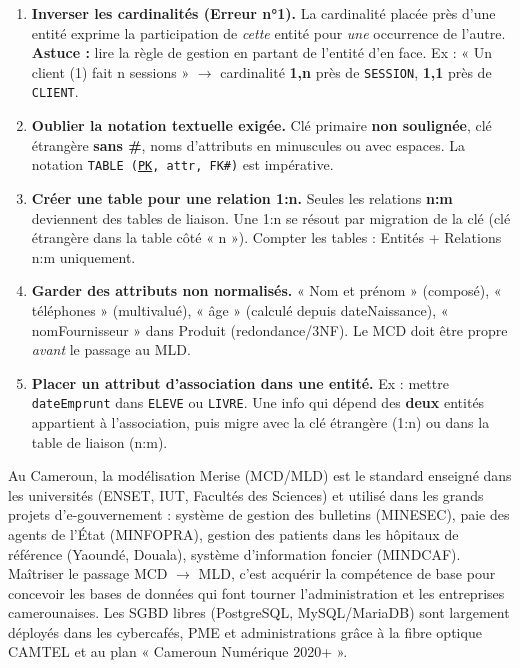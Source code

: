 \documentclass[11pt]{article}
\begin{document}
\begin{attention}
\begin{enumerate}
\item \textbf{Inverser les cardinalités (Erreur n°1).} La cardinalité placée près d'une entité exprime la participation de \emph{cette} entité pour \emph{une} occurrence de l'autre. \textbf{Astuce :} lire la règle de gestion en partant de l'entité d'en face. Ex : « Un client (1) fait n sessions » $\to$ cardinalité \textbf{1,n} près de \texttt{SESSION}, \textbf{1,1} près de \texttt{CLIENT}.
\item \textbf{Oublier la notation textuelle exigée.} Clé primaire \textbf{non soulignée}, clé étrangère \textbf{sans \#}, noms d'attributs en minuscules ou avec espaces. La notation \texttt{TABLE (\underline{PK}, attr, FK\#)} est impérative.
\item \textbf{Créer une table pour une relation 1:n.} Seules les relations \textbf{n:m} deviennent des tables de liaison. Une 1:n se résout par migration de la clé (clé étrangère dans la table côté « n »). Compter les tables : Entités + Relations n:m uniquement.
\item \textbf{Garder des attributs non normalisés.} « Nom et prénom » (composé), « téléphones » (multivalué), « âge » (calculé depuis dateNaissance), « nomFournisseur » dans Produit (redondance/3NF). Le MCD doit être propre \emph{avant} le passage au MLD.
\item \textbf{Placer un attribut d'association dans une entité.} Ex : mettre \texttt{dateEmprunt} dans \texttt{ELEVE} ou \texttt{LIVRE}. Une info qui dépend des \textbf{deux} entités appartient à l'association, puis migre avec la clé étrangère (1:n) ou dans la table de liaison (n:m).
\end{enumerate}
\end{attention}

\begin{savaistu}
Au Cameroun, la modélisation Merise (MCD/MLD) est le standard enseigné dans les universités (ENSET, IUT, Facultés des Sciences) et utilisé dans les grands projets d'e-gouvernement : système de gestion des bulletins (MINESEC), paie des agents de l'État (MINFOPRA), gestion des patients dans les hôpitaux de référence (Yaoundé, Douala), système d'information foncier (MINDCAF). Maîtriser le passage MCD $\to$ MLD, c'est acquérir la compétence de base pour concevoir les bases de données qui font tourner l'administration et les entreprises camerounaises. Les SGBD libres (PostgreSQL, MySQL/MariaDB) sont largement déployés dans les cybercafés, PME et administrations grâce à la fibre optique CAMTEL et au plan « Cameroun Numérique 2020+ ».
\end{savaistu}
\end{document}
